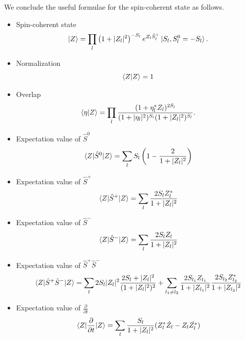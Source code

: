 \documentclass[11pt]{book} %
\begin{document}
We conclude the useful formulae for the spin-coherent state as follows.
\begin{framed}
  \begin{itemize}
 \item Spin-coherent state 
\begin{equation}
	\ket{Z} = \prod_{l} \left(1+|Z_l|^2\right)^{-S_l}
	e^{Z_l \hat{S}_l^{+}} \ket{S_l, S_l^0=-S_l} .
 \label{coherent}
\end{equation}
 \item Normalization
\begin{equation}
	\braket{Z|Z} = 1
\end{equation}
 \item Overlap
\begin{equation}
	  \braket{\eta|Z} = \prod_l \frac{(1+\eta_l^*Z_l)^{2S_l}}{(1+|\eta_l|^2)^{S_l}(1+|Z_l|^2)^{S_l}} .
  \label{overlap}
\end{equation}
 \item Expectation value of $\hat{S}^0$
\begin{equation}
     \braket{Z|\hat{S}^0|Z} = \sum_l S_l\left( 1-\frac{2}{1+|Z_l|^2} \right)
\end{equation}
 \item Expectation value of $\hat{S}^+$
\begin{equation}
     \braket{Z|\hat{S}^+|Z} = \sum_l \frac{2S_lZ_l^*}{1+|Z_l|^2}
\end{equation}
 \item Expectation value of $\hat{S}^-$
\begin{equation}
     \braket{Z|\hat{S}^-|Z} = \sum_l \frac{2S_lZ_l}{1+|Z_l|^2}
\end{equation}
 \item Expectation value of $\hat{S}^+\hat{S}^-$
\begin{equation}
    \braket{Z|\hat{S}^+\hat{S}^-|Z} = \sum_l 2S_l|Z_l|^2\frac{2S_l+|Z_l|^2}{(1+|Z_l|^2)^2}
    + \sum_{l_1 \neq l_2} \frac{2S_{l_1}Z_{l_1}}{1+|Z_{l_1}|^2}\frac{2S_{l_2}Z_{l_2}^*}{1+|Z_{l_2}|^2}
\end{equation}
 \item Expectation value of $\frac{\partial}{\partial t}$
\begin{equation}
       \braket{Z|\frac{\partial}{\partial t}|Z} = \sum_l \frac{S_l}{1+|Z_l|^2}(Z_l^*\dot{Z_l}-Z_l\dot{Z_l^*})
	\label{ddt}
\end{equation}
\end{itemize}
\end{framed}
\end{document}
